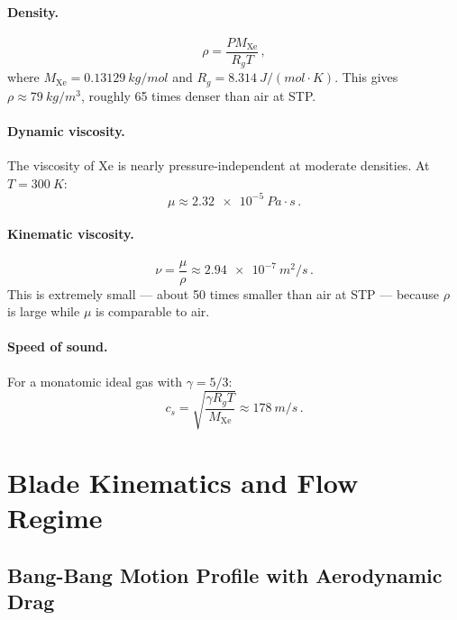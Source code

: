 \documentclass[11pt,a4paper]{article}
\begin{document}
\paragraph{Density.}
\begin{equation}
  \rho = \frac{P M_\mathrm{Xe}}{R_g T}\,,
  \label{eq:density}
\end{equation}
where $M_\mathrm{Xe} = \SI{0.13129}{kg/mol}$ and
$R_g = \SI{8.314}{J/(mol\cdot K)}$. This gives
$\rho \approx \SI{79}{kg/m^3}$, roughly 65 times denser than air at STP.

\paragraph{Dynamic viscosity.}
The viscosity of Xe is nearly pressure-independent at moderate densities.
At $T = \SI{300}{K}$:
\begin{equation}
  \mu \approx \SI{2.32e-5}{Pa\cdot s}\,.
\end{equation}

\paragraph{Kinematic viscosity.}
\begin{equation}
  \nu = \frac{\mu}{\rho} \approx \SI{2.94e-7}{m^2/s}\,.
  \label{eq:nu}
\end{equation}
This is extremely small --- about 50 times smaller than air at STP ---
because $\rho$ is large while $\mu$ is comparable to air.

\paragraph{Speed of sound.}
For a monatomic ideal gas with $\gamma = 5/3$:
\begin{equation}
  c_s = \sqrt{\frac{\gamma R_g T}{M_\mathrm{Xe}}}
      \approx \SI{178}{m/s}\,.
  \label{eq:cs}
\end{equation}


\section{Blade Kinematics and Flow Regime}
\label{sec:kinematics}

\subsection{Bang-Bang Motion Profile with Aerodynamic Drag}
\end{document}
